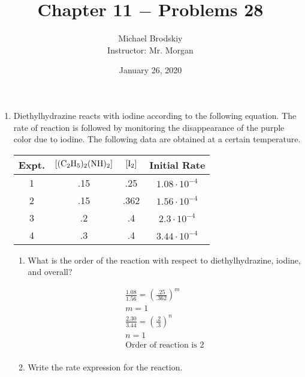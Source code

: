 \documentclass[12pt]{article}
\title{Chapter 11 $-$ Problems 28}
\date{January 26, 2020}
\author{Michael Brodskiy\\ \small Instructor: Mr. Morgan}
\begin{document}
\maketitle

\begin{enumerate}

  \item Diethylhydrazine reacts with iodine according to the following equation. The rate of reaction is followed by monitoring the disappearance of the purple color due to iodine. The following data are obtained at a certain temperature. 

    \begin{center}
    \end{center}

    \begin{tabular}[H]{c c c c}
      \hline
      Expt. & $[\ce{(C2H5)2(NH)2}]$ & $[\ce{I2}]$ & Initial Rate \\
      \hline
      1 & .15 & .25 & $1.08\cdot10^{-4}$ \\
      2 & .15 & .362 & $1.56\cdot10^{-4}$ \\
      3 & .2 & .4 & $2.3\cdot10^{-4}$ \\
      4 & .3 & .4 & $3.44\cdot10^{-4}$\\
      \hline
    \end{tabular}

    \begin{enumerate}

      \item What is the order of the reaction with respect to diethylhydrazine, iodine, and overall?

        \begin{equation}
          \begin{split}
            \frac{1.08}{1.56}=\left( \frac{.25}{.362} \right)^m\\
            m=1\\
            \frac{2.30}{3.44}=\left( \frac{.2}{.3} \right)^n\\
            n=1\\
          \text{Order of reaction is 2}\\
          \end{split}
          \label{1}
        \end{equation}

      \item Write the rate expression for the reaction.


\end{enumerate}
\end{enumerate}
\end{document}
